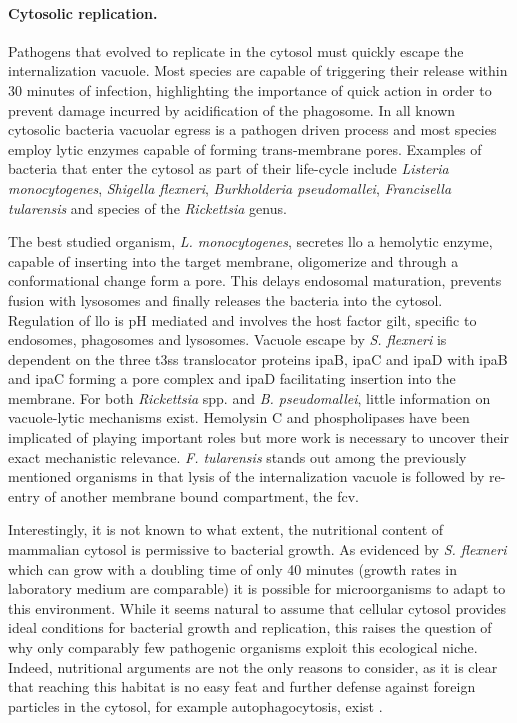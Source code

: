 \paragraph{Cytosolic replication.}
Pathogens that evolved to replicate in the cytosol must quickly escape the internalization vacuole. Most species are capable of triggering their release within 30 minutes of infection, highlighting the importance of quick action in order to prevent damage incurred by acidification of the phagosome. In all known cytosolic bacteria vacuolar egress is a pathogen driven process and most species employ lytic enzymes capable of forming trans-membrane pores. Examples of bacteria that enter the cytosol as part of their life-cycle include \textit{Listeria monocytogenes}, \textit{Shigella flexneri}, \textit{Burkholderia pseudomallei}, \textit{Francisella tularensis} and species of the \textit{Rickettsia} genus.

The best studied organism, \textit{L. monocytogenes}, secretes \gls{llo} a hemolytic enzyme, capable of inserting into the target membrane, oligomerize and through a conformational change form a pore. This delays endosomal maturation, prevents fusion with lysosomes and finally releases the bacteria into the cytosol. Regulation of \gls{llo} is pH mediated and involves the host factor \gls{gilt}, specific to endosomes, phagosomes and lysosomes. Vacuole escape by \textit{S. flexneri} is dependent on the three \gls{t3ss} translocator proteins \gls{ipa}B, \gls{ipa}C and \gls{ipa}D with \gls{ipa}B and \gls{ipa}C forming a pore complex and \gls{ipa}D facilitating insertion into the membrane. For both \textit{Rickettsia} spp. and \textit{B. pseudomallei}, little information on vacuole-lytic mechanisms exist. Hemolysin C and phospholipases have been implicated of playing important roles but more work is necessary to uncover their exact mechanistic relevance. \textit{F. tularensis} stands out among the previously mentioned organisms in that lysis of the internalization vacuole is followed by re-entry of another membrane bound compartment, the \gls{fcv}.

Interestingly, it is not known to what extent, the nutritional content of mammalian cytosol is permissive to bacterial growth. As evidenced by \textit{S. flexneri} which can grow with a doubling time of only 40 minutes (growth rates in laboratory medium are comparable) it is possible for microorganisms to adapt to this environment. While it seems natural to assume that cellular cytosol provides ideal conditions for bacterial growth and replication, this raises the question of why only comparably few pathogenic organisms exploit this ecological niche. Indeed, nutritional arguments are not the only reasons to consider, as it is clear that reaching this habitat is no easy feat and further defense against foreign particles in the cytosol, for example autophagocytosis, exist \citep{Ray2009}.

